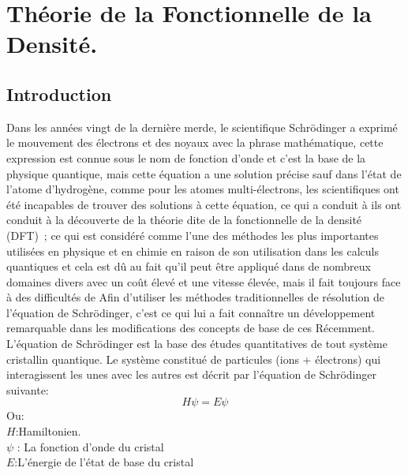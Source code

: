 
\chapter{Théorie de la Fonctionnelle de la Densité.} %

\label{Chapter2} 
\section{Introduction}
Dans les années vingt de la dernière merde, le scientifique Schrödinger a exprimé le mouvement des électrons et des noyaux avec la phrase mathématique, cette expression est connue sous le nom de fonction d'onde et c'est la base de la physique quantique, mais cette équation a une solution précise sauf dans l'état de l'atome d'hydrogène, comme pour les atomes multi-électrons, les scientifiques ont été incapables de trouver des solutions à cette équation, ce qui a conduit à ils ont conduit à la découverte de la théorie dite de la fonctionnelle de la densité (DFT) ; ce qui est considéré comme l'une des méthodes les plus importantes utilisées en physique et en chimie en raison de son utilisation dans les calculs quantiques et cela est dû au fait qu'il peut être appliqué dans de nombreux domaines divers avec un coût élevé et une vitesse élevée, mais il fait toujours face à des difficultés de Afin d'utiliser les méthodes traditionnelles de résolution de l'équation de Schrödinger, c'est ce qui lui a fait connaître un développement remarquable dans les modifications des concepts de base de ces Récemment.
L'équation de Schrödinger est la base des études quantitatives de tout système cristallin quantique. Le système constitué de particules (ions + électrons) qui interagissent les unes avec les autres est décrit par l'équation de Schrödinger suivante:
\begin{equation}\label{2-1}
	H\psi = E\psi
\end{equation}
Ou:\\
$ H $:Hamiltonien.\\
$ \psi $ : La fonction d'onde du cristal\\

$ E $:L'énergie de l'état de base du cristal\\


